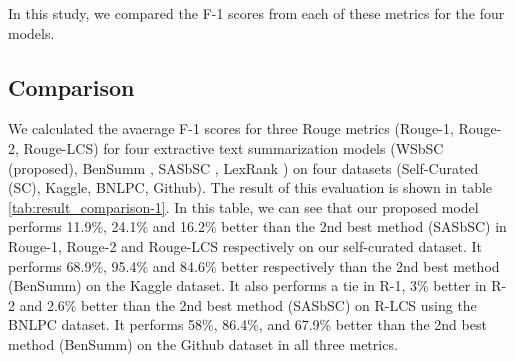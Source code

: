 In this study, we compared the F-1 scores from each of these metrics for the four models.

\subsection{Comparison}\label{subsec:comparison}
We calculated the avaerage F-1 scores for three Rouge metrics (Rouge-1, Rouge-2, Rouge-LCS) for four extractive text summarization models (WSbSC (proposed), BenSumm \cite{chowdhury-etal-2021-tfidf-clustering}, SASbSC \cite{roychowdhury-etal-2022-spectral-base}, LexRank \cite{Erkan-lexRank-2004}) on four datasets (Self-Curated (SC), Kaggle, BNLPC, Github). The result of this evaluation is shown in table \ref{tab:result_comparison-1}. In this table, we can see that our proposed model performs  11.9\%, 24.1\% and 16.2\% better than the 2nd best method (SASbSC) in Rouge-1, Rouge-2 and Rouge-LCS respectively on our self-curated dataset. It performs 68.9\%, 95.4\% and 84.6\% better respectively than the 2nd best method (BenSumm) on the Kaggle dataset. It also performs a tie in R-1, 3\% better in R-2 and 2.6\% better than the 2nd best method (SASbSC) on R-LCS using the BNLPC dataset. It performs 58\%, 86.4\%, and 67.9\% better than the 2nd best method (BenSumm) on the Github dataset in all three metrics.\\


